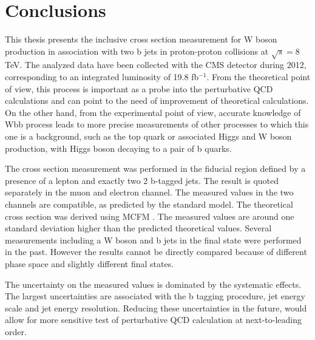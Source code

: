 
\chapter{Conclusions} %

\label{Chapter8} %


This thesis presents the inclusive cross section measurement for W boson production in association with two b jets in proton-proton collisions at $\sqrt{s}=$8 TeV. The analyzed data have been collected with the CMS detector during 2012, corresponding to an integrated luminosity of 19.8 fb$^{-1}$. From the theoretical point of view, this process is important as a probe into the perturbative QCD calculations and can point to the need of improvement of theoretical calculations. On the other hand, from the experimental  point of view, accurate  knowledge of Wbb process leads to more precise measurements of other processes to which this one is a background, such as the top quark or associated Higgs and W boson production, with Higgs boson  decaying to a pair of b quarks.

\par The cross section measurement was performed in the fiducial region defined by a presence of a lepton and exactly two 2 b-tagged jets. The result is quoted separately in the muon and electron channel. The measured values in the two channels are compatible, as predicted by the standard model. The theoretical cross section was derived using MCFM . The measured values are around one standard deviation higher than the predicted theoretical values. Several measurements including a W boson and b jets in the final state were performed in the past. However the results cannot be directly compared because of different phase space and slightly different final states.

The uncertainty on the measured values is dominated by the systematic effects. The largest uncertainties are associated with the b tagging procedure, jet energy scale and jet energy resolution. Reducing these uncertainties in the future, would allow for more sensitive test of perturbative QCD calculation at next-to-leading order.


